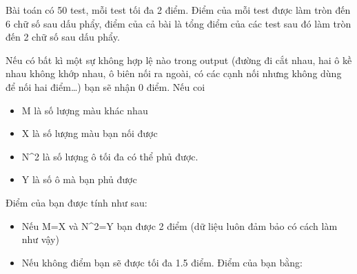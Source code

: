 Bài toán có 50 test, mỗi test tối đa 2 điểm. Điểm của mỗi test được làm tròn đến 6 chữ số sau dấu phẩy, điểm của cả bài là tổng điểm của các test sau đó làm tròn đến 2 chữ số sau dấu phẩy.

Nếu có bất kì một sự không hợp lệ nào trong output (đường đi cắt nhau, hai ô kề nhau không khớp nhau, ô biên nối ra ngoài, có các cạnh nối nhưng không dùng để nối hai điểm…) bạn sẽ nhận 0 điểm. Nếu coi 
\begin{itemize}
	\item M là số lượng màu khác nhau
	\item X là số lượng màu bạn nối được
	\item N\textasciicircum2 là số lượng ô tối đa có thể phủ được.
	\item Y là số ô mà bạn phủ được
\end{itemize}

Điểm của bạn được tính như sau:
\begin{itemize}
	\item Nếu M=X và N\textasciicircum2=Y bạn được 2 điểm (dữ liệu luôn đảm bảo có cách làm như vậy)
	\item Nếu không điểm bạn sẽ được tối đa 1.5 điểm. Điểm của bạn bằng:
\end{itemize}


